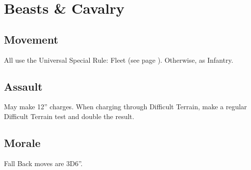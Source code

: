 \section{Beasts \& Cavalry}
\subsection{Movement}
All use the Universal Special Rule: Fleet (see page \pageref{sec:universalspecialrules}).
Otherwise, as Infantry.
\subsection{Assault}
May make 12” charges. When charging through Difficult
Terrain, make a regular Difficult Terrain test and double the
result.
\subsection{Morale}
Fall Back moves are 3D6”.
